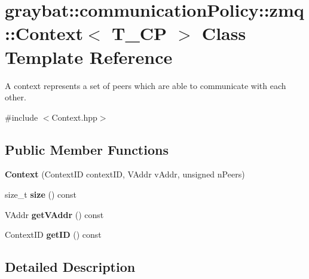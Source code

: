 \hypertarget{classgraybat_1_1communicationPolicy_1_1zmq_1_1Context}{}\section{graybat\+:\+:communication\+Policy\+:\+:zmq\+:\+:Context$<$ T\+\_\+\+C\+P $>$ Class Template Reference}
\label{classgraybat_1_1communicationPolicy_1_1zmq_1_1Context}


A context represents a set of peers which are able to communicate with each other.  




{\ttfamily \#include $<$Context.\+hpp$>$}

\subsection*{Public Member Functions}
\begin{DoxyCompactItemize}
\item 
\hypertarget{classgraybat_1_1communicationPolicy_1_1zmq_1_1Context_a81204113ab8bd99171f0786b93d4cbc5}{}{\bfseries Context} (Context\+I\+D context\+I\+D, V\+Addr v\+Addr, unsigned n\+Peers)\label{classgraybat_1_1communicationPolicy_1_1zmq_1_1Context_a81204113ab8bd99171f0786b93d4cbc5}

\item 
\hypertarget{classgraybat_1_1communicationPolicy_1_1zmq_1_1Context_a5ebe5ed8d230b734afd4c5d8eedf9812}{}size\+\_\+t {\bfseries size} () const \label{classgraybat_1_1communicationPolicy_1_1zmq_1_1Context_a5ebe5ed8d230b734afd4c5d8eedf9812}

\item 
\hypertarget{classgraybat_1_1communicationPolicy_1_1zmq_1_1Context_a7cce1629d57bd2289632050a5a8feaf1}{}V\+Addr {\bfseries get\+V\+Addr} () const \label{classgraybat_1_1communicationPolicy_1_1zmq_1_1Context_a7cce1629d57bd2289632050a5a8feaf1}

\item 
\hypertarget{classgraybat_1_1communicationPolicy_1_1zmq_1_1Context_a39ddc0058ed3e625e9ceba55c91eac30}{}Context\+I\+D {\bfseries get\+I\+D} () const \label{classgraybat_1_1communicationPolicy_1_1zmq_1_1Context_a39ddc0058ed3e625e9ceba55c91eac30}

\end{DoxyCompactItemize}


\subsection{Detailed Description}

